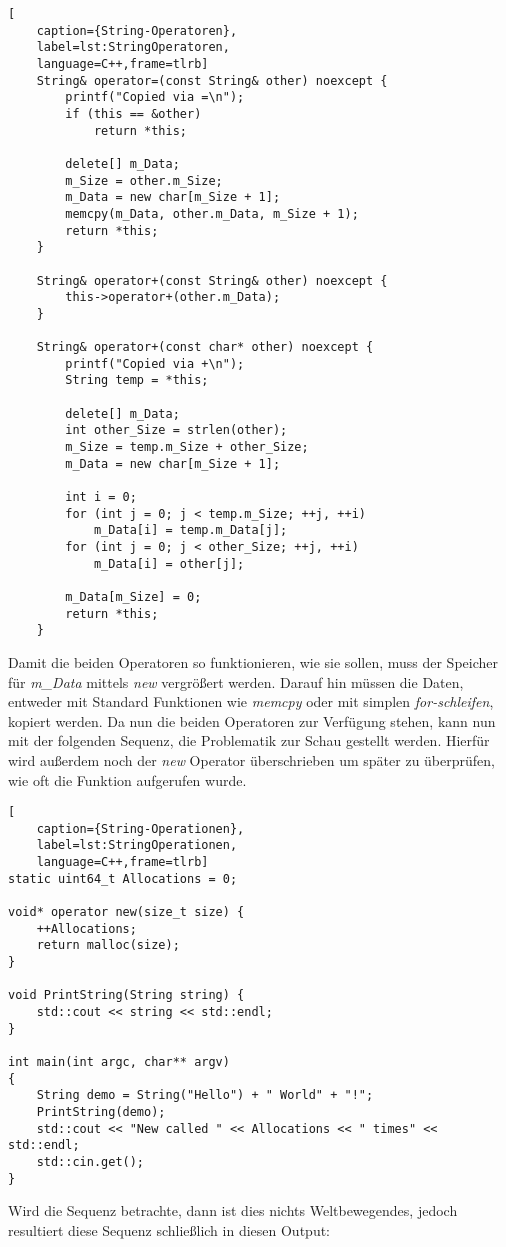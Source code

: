 \begin{lstlisting}[
    caption={String-Operatoren},
    label=lst:StringOperatoren,
    language=C++,frame=tlrb]
	String& operator=(const String& other) noexcept {
		printf("Copied via =\n");
		if (this == &other)
			return *this;

		delete[] m_Data;
		m_Size = other.m_Size;
		m_Data = new char[m_Size + 1];
		memcpy(m_Data, other.m_Data, m_Size + 1);
		return *this;
	}

	String& operator+(const String& other) noexcept {
		this->operator+(other.m_Data);
	}

	String& operator+(const char* other) noexcept {
		printf("Copied via +\n");
		String temp = *this;

		delete[] m_Data;
		int other_Size = strlen(other);
		m_Size = temp.m_Size + other_Size;
		m_Data = new char[m_Size + 1];

		int i = 0;
		for (int j = 0; j < temp.m_Size; ++j, ++i)
			m_Data[i] = temp.m_Data[j];
		for (int j = 0; j < other_Size; ++j, ++i)
			m_Data[i] = other[j];

		m_Data[m_Size] = 0;
		return *this;
	}
\end{lstlisting}

Damit die beiden Operatoren so funktionieren, wie sie sollen, muss der Speicher für \emph{m\_Data}
mittels \emph{new} vergrößert werden. Darauf hin müssen die Daten, entweder mit Standard Funktionen
wie \emph{memcpy} oder mit simplen \emph{for-schleifen}, kopiert werden.
\newline
\newline
Da nun die beiden Operatoren zur Verfügung stehen, kann nun mit der folgenden Sequenz, die
Problematik zur Schau gestellt werden. Hierfür wird außerdem noch der \emph{new} Operator
überschrieben um später zu überprüfen, wie oft die Funktion aufgerufen wurde.

\begin{lstlisting}[
    caption={String-Operationen},
    label=lst:StringOperationen,
    language=C++,frame=tlrb]
static uint64_t Allocations = 0;

void* operator new(size_t size) {
	++Allocations;
	return malloc(size);
}

void PrintString(String string) {
	std::cout << string << std::endl;
}

int main(int argc, char** argv)
{
	String demo = String("Hello") + " World" + "!";
	PrintString(demo);
	std::cout << "New called " << Allocations << " times" << std::endl;
	std::cin.get();
}
\end{lstlisting}
Wird die Sequenz betrachte, dann ist dies nichts Weltbewegendes, jedoch resultiert diese Sequenz
schließlich in diesen Output:

